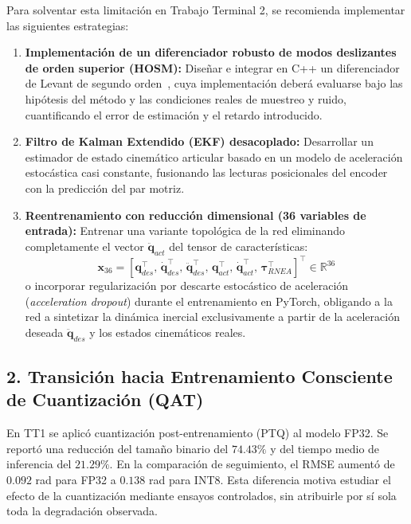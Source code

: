 \documentclass[12pt]{article}
\begin{document}
Para solventar esta limitación en Trabajo Terminal 2, se recomienda implementar las siguientes estrategias:
\begin{enumerate}
    \item \textbf{Implementación de un diferenciador robusto de modos deslizantes de orden superior (HOSM):} Diseñar e integrar en C++ un diferenciador de Levant de segundo orden~\cite{levant2003higher}, cuya implementación deberá evaluarse bajo las hipótesis del método y las condiciones reales de muestreo y ruido, cuantificando el error de estimación y el retardo introducido.
    \item \textbf{Filtro de Kalman Extendido (EKF) desacoplado:} Desarrollar un estimador de estado cinemático articular basado en un modelo de aceleración estocástica casi constante, fusionando las lecturas posicionales del encoder con la predicción del par motriz.
    \item \textbf{Reentrenamiento con reducción dimensional (36 variables de entrada):} Entrenar una variante topológica de la red eliminando completamente el vector $\ddot{\bm{q}}_{act}$ del tensor de características:
    \begin{equation}
        \bm{x}_{36} = \left[ \bm{q}_{des}^\top, \, \dot{\bm{q}}_{des}^\top, \, \ddot{\bm{q}}_{des}^\top, \, \bm{q}_{act}^\top, \, \dot{\bm{q}}_{act}^\top, \, \bm{\tau}_{RNEA}^\top \right]^\top \in \mathbb{R}^{36}
    \end{equation}
    o incorporar regularización por descarte estocástico de aceleración (\textit{acceleration dropout}) durante el entrenamiento en PyTorch, obligando a la red a sintetizar la dinámica inercial exclusivamente a partir de la aceleración deseada $\ddot{\bm{q}}_{des}$ y los estados cinemáticos reales.
\end{enumerate}

\subsection*{2. Transición hacia Entrenamiento Consciente de Cuantización (QAT)}

En TT1 se aplicó cuantización post-entrenamiento (PTQ) al modelo FP32. Se reportó una reducción del tamaño binario del $74.43\%$ y del tiempo medio de inferencia del $21.29\%$. En la comparación de seguimiento, el RMSE aumentó de $0.092$ rad para FP32 a $0.138$ rad para INT8. Esta diferencia motiva estudiar el efecto de la cuantización mediante ensayos controlados, sin atribuirle por sí sola toda la degradación observada.
\end{document}
